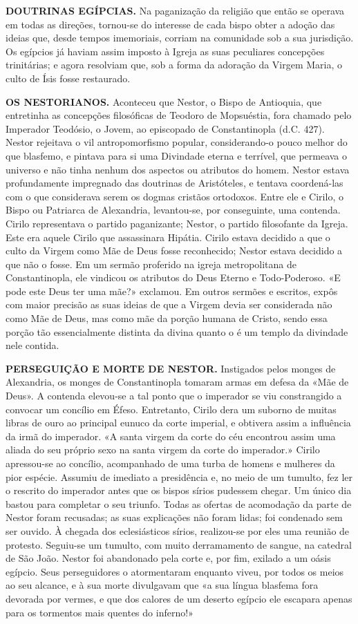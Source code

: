 \documentclass[11pt,a5paper,twoside,openany]{book}
\begin{document}
\textbf{DOUTRINAS EGÍPCIAS.} Na paganização da religião que então se operava em todas as direções, tornou-se do interesse de cada bispo obter a adoção das ideias que, desde tempos imemoriais, corriam na comunidade sob a sua jurisdição. Os egípcios já haviam assim imposto à Igreja as suas peculiares concepções trinitárias; e agora resolviam que, sob a forma da adoração da Virgem Maria, o culto de Ísis fosse restaurado.

\textbf{OS NESTORIANOS.} Aconteceu que Nestor, o Bispo de Antioquia, que entretinha as concepções filosóficas de Teodoro de Mopsuéstia, fora chamado pelo Imperador Teodósio, o Jovem, ao episcopado de Constantinopla (d.C. 427). Nestor rejeitava o vil antropomorfismo popular, considerando-o pouco melhor do que blasfemo, e pintava para si uma Divindade eterna e terrível, que permeava o universo e não tinha nenhum dos aspectos ou atributos do homem. Nestor estava profundamente impregnado das doutrinas de Aristóteles, e tentava coordená-las com o que considerava serem os dogmas cristãos ortodoxos. Entre ele e Cirilo, o Bispo ou Patriarca de Alexandria, levantou-se, por conseguinte, uma contenda. Cirilo representava o partido paganizante; Nestor, o partido filosofante da Igreja. Este era aquele Cirilo que assassinara Hipátia. Cirilo estava decidido a que o culto da Virgem como Mãe de Deus fosse reconhecido; Nestor estava decidido a que não o fosse. Em um sermão proferido na igreja metropolitana de Constantinopla, ele vindicou os atributos do Deus Eterno e Todo-Poderoso. «E pode este Deus ter uma mãe?» exclamou. Em outros sermões e escritos, expôs com maior precisão as suas ideias de que a Virgem devia ser considerada não como Mãe de Deus, mas como mãe da porção humana de Cristo, sendo essa porção tão essencialmente distinta da divina quanto o é um templo da divindade nele contida.

\textbf{PERSEGUIÇÃO E MORTE DE NESTOR.} Instigados pelos monges de Alexandria, os monges de Constantinopla tomaram armas em defesa da «Mãe de Deus». A contenda elevou-se a tal ponto que o imperador se viu constrangido a convocar um concílio em Éfeso. Entretanto, Cirilo dera um suborno de muitas libras de ouro ao principal eunuco da corte imperial, e obtivera assim a influência da irmã do imperador. «A santa virgem da corte do céu encontrou assim uma aliada do seu próprio sexo na santa virgem da corte do imperador.» Cirilo apressou-se ao concílio, acompanhado de uma turba de homens e mulheres da pior espécie. Assumiu de imediato a presidência e, no meio de um tumulto, fez ler o rescrito do imperador antes que os bispos sírios pudessem chegar. Um único dia bastou para completar o seu triunfo. Todas as ofertas de acomodação da parte de Nestor foram recusadas; as suas explicações não foram lidas; foi condenado sem ser ouvido. À chegada dos eclesiásticos sírios, realizou-se por eles uma reunião de protesto. Seguiu-se um tumulto, com muito derramamento de sangue, na catedral de São João. Nestor foi abandonado pela corte e, por fim, exilado a um oásis egípcio. Seus perseguidores o atormentaram enquanto viveu, por todos os meios ao seu alcance, e à sua morte divulgavam que «a sua língua blasfema fora devorada por vermes, e que dos calores de um deserto egípcio ele escapara apenas para os tormentos mais quentes do inferno!»
\end{document}
